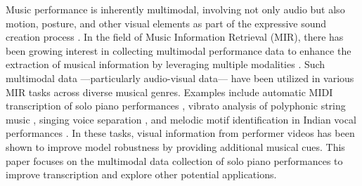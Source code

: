\documentclass{article}
\begin{document}
Music performance is inherently multimodal, involving not only audio but also motion, posture, and other visual elements as part of the expressive sound creation process \cite{PPR09Bergeron, MusicPercep12Platz}. In the field of Music Information Retrieval (MIR), there has been growing interest in collecting multimodal performance data to enhance the extraction of musical information by leveraging multiple modalities \cite{TMM18Li, IEEE19Duan}. Such multimodal data ---particularly audio-visual data--- have been utilized in various MIR tasks across diverse musical genres. Examples include automatic MIDI transcription of solo piano performances \cite{ICASSP20Koepke, ICASSPW23Li}, vibrato analysis of polyphonic string music \cite{SMC17Li}, singing voice separation \cite{BMVC21Montesinos}, and melodic motif identification in Indian vocal performances \cite{TISMIR24Nadkarni}. In these tasks, visual information from performer videos has been shown to improve model robustness by providing additional musical cues. This paper focuses on the multimodal data collection of solo piano performances to improve transcription and explore other potential applications.  


\end{document}
